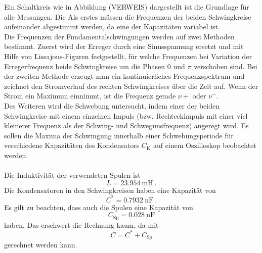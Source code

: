 Ein Schaltkreis wie in Abbildung (VERWEIS) dargestellt ist die Grundlage für alle Messungen. Die Als erstes müssen die Frequenzen der beiden Schwingkreise aufeinander abgestimmt werden, da eine der Kapazitäten variabel ist. \\
Die Frequenzen der Fundamentalschwingungen werden auf zwei Methoden bestimmt. Zuerst wird der Erreger durch eine Sinusspannung ersetzt und mit Hilfe von Lissajous-Figuren festgestellt, für welche Frequenzen bei Variation der Erregerfrequenz beide Schwingkreise um die Phasen 0 und $\pi$ verschoben sind. Bei der zweiten Methode erzeugt man ein kontinuierliches Frequenzspektrum und zeichnet den Stromverlauf des rechten Schwingkreises über die Zeit auf. Wenn der Strom ein Maximum einnimmt, ist die Frequenz gerade $\nu+$ oder $\nu^-$. \\
Des Weiteren wird die Schwebung untersucht, indem einer der beiden Schwingkreise mit einem einzelnen Impuls (bzw. Rechteckimpuls mit einer viel kleinerer Frequenz als der Schwing- und Schwegunsfrequenz) angeregt wird. Es sollen die Maxima der Schwingung innerhalb einer Schwebungsperiode für verschiedene Kapazitäten des Kondensators $C_\text{K}$ auf einem Oszilloskop beobachtet werden. \\
\ \\
Die Induktivität der verwendeten Spulen ist
\[ L = \SI{23.954}{\milli\henry} \ . \]
Die Kondensatoren in den Schwingkreisen haben eine Kapazität von
\[ C^* = \SI{0.7932}{\nano\farad} \ . \]
Es gilt zu beachten, dass auch die Spulen eine Kapazität von
\[ C_\text{Sp} = \SI{0.028}{\nano\farad} \]
haben. Das erschwert die Rechnung kaum, da mit
\[ C = C^* + C_\text{Sp} \]
gerechnet werden kann. \\